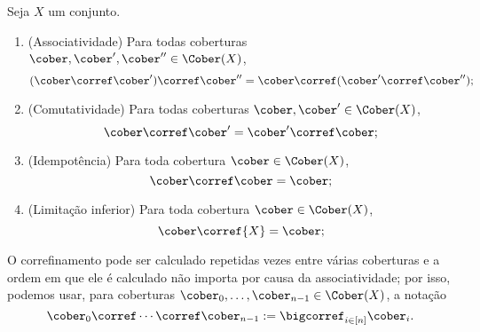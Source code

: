 \begin{exercise}
Seja $X$ um conjunto.
	\begin{enumerate}
	\item (Associatividade) Para todas coberturas $\cober, \cober', \cober'' \in \Cober(X)$,
		\begin{equation*}
		(\cober \corref \cober') \corref \cober'' = \cober \corref (\cober' \corref \cober'');
		\end{equation*}
	\item (Comutatividade) Para todas coberturas $\cober, \cober' \in \Cober(X)$,
		\begin{equation*}
		\cober \corref \cober' = \cober' \corref \cober;
		\end{equation*}
	\item (Idempotência) Para toda cobertura $\cober \in \Cober(X)$,
		\begin{equation*}
		\cober \corref \cober = \cober;
		\end{equation*}

	\item (Limitação inferior) Para toda cobertura $\cober \in \Cober(X)$,
		\begin{equation*}
		\cober \corref \{X\} = \cober;
		\end{equation*}
	\end{enumerate}
\end{exercise}


O correfinamento pode ser calculado repetidas vezes entre várias coberturas e a ordem em que ele é calculado não importa por causa da associatividade; por isso, podemos usar, para coberturas $\cober_0, \ldots, \cober_{n-1} \in \Cober(X)$, a notação
	\begin{equation*}
	\cober_0 \corref \cdots \corref \cober_{n-1} := \bigcorref_{i \in [n]} \cober_i. 
	\end{equation*}

